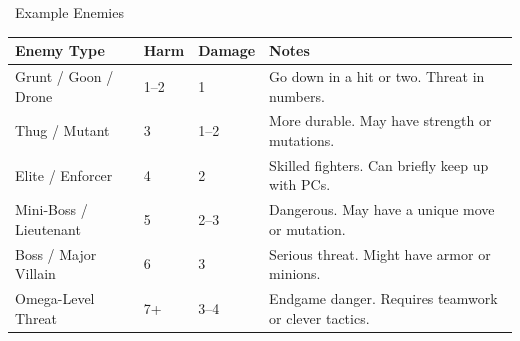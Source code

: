 \Large{}~Example Enemies\medskip\\
\normalfont\large
\begin{tabular}{|l|l|l|l|}
    \hline
    \textbf{Enemy Type} & \textbf{Harm} & \textbf{Damage} & \textbf{Notes} \\
    \hline
    Grunt / Goon / Drone & 1--2 & 1 & Go down in a hit or two. Threat in numbers. \\
    \hline
    Thug / Mutant & 3 & 1--2 & More durable. May have strength or mutations. \\
    \hline
    Elite / Enforcer & 4 & 2 & Skilled fighters. Can briefly keep up with PCs. \\
    \hline
    Mini-Boss / Lieutenant & 5 & 2--3 & Dangerous. May have a unique move or mutation. \\
    \hline
    Boss / Major Villain & 6 & 3 & Serious threat. Might have armor or minions. \\
    \hline
    Omega-Level Threat & 7+ & 3--4 & Endgame danger. Requires teamwork or clever tactics. \\
    \hline
\end{tabular}

\vfill

